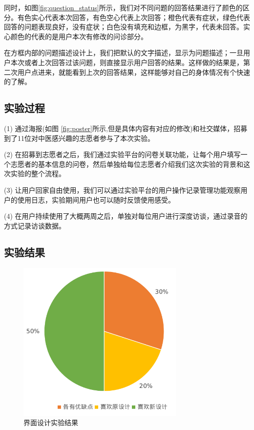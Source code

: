 同时，如图\ref{fig:question_status}所示，我们对不同问题的回答结果进行了颜色的区分。有色实心代表本次回答，有色空心代表上次回答；橙色代表有症状，绿色代表回答的问题表现良好，没有症状；白色没有填充和边框，为黑字，代表未回答。实心颜色的代表的是用户本次有修改的问诊部分。

在方框内部的问题描述设计上，我们把默认的文字描述，显示为问题描述；一旦用户本次或者上次回答过该问题，则直接显示用户回答的结果。这样做的结果是，第二次用户点进来，就能看到上次的回答结果，这样能够对自己的身体情况有个快速的了解。


\subsection{实验过程}


(1) 通过海报(如图 \ref{fig:poster}所示,但是具体内容有对应的修改)和社交媒体，招募到了11位对中医感兴趣的志愿者参与了本次实验。

(2) 在招募到志愿者之后，我们通过实验平台的问卷关联功能，让每个用户填写一个志愿者的基本信息的问卷，然后单独给每位志愿者介绍我们这次实验的背景和这次实验的整个流程。

(3) 让用户回家自由使用，我们可以通过实验平台的用户操作记录管理功能观察用户的使用日志，实验期间用户也可以随时反馈使用感受。

(4)  在用户持续使用了大概两周之后，单独对每位用户进行深度访谈，通过录音的方式记录访谈数据。



\subsection{实验结果}


\begin{figure}[ht]
    \centering
    \includegraphics[height=8cm]{images/ui-exp.png}
    \caption{界面设计实验结果}
    \label{fig:ui-exp}
\end{figure}

